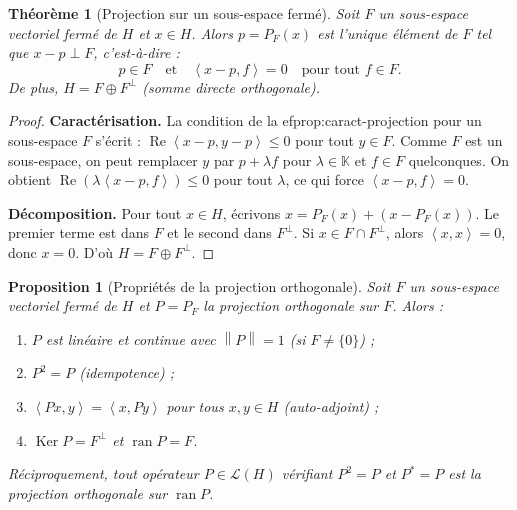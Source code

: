 \documentclass[a4paper,12pt]{book}
\DeclareMathOperator{\Ker}{Ker}
\DeclareMathOperator{\ran}{ran}
\newcommand{\K}{\mathbb{K}}
\newcommand{\norm}[1]{\left\| #1 \right\|}
\newcommand{\inner}[2]{\left\langle #1, #2 \right\rangle}
\theoremstyle{definition}
\theoremstyle{plain}
\newtheorem{theoreme}[definition]{Théorème}
\newtheorem{proposition}[definition]{Proposition}
\theoremstyle{remark}
\begin{document}
\begin{theoreme}[Projection sur un sous-espace fermé]\label{thm:proj-sous-espace}
Soit $F$ un sous-espace vectoriel fermé de $H$ et $x \in H$. Alors $p = P_F(x)$ est l'unique élément de $F$ tel que $x - p \perp F$, c'est-à-dire :
\[
    p \in F \quad \text{et} \quad \inner{x - p}{f} = 0 \quad \text{pour tout } f \in F.
\]
De plus, $H = F \oplus F^\perp$ (somme directe orthogonale).
\end{theoreme}

\begin{proof}
\textbf{Caractérisation.} La condition de la 
ef{prop:caract-projection} pour un sous-espace $F$ s'écrit : $\operatorname{Re}\inner{x-p}{y-p} \leq 0$ pour tout $y \in F$. Comme $F$ est un sous-espace, on peut remplacer $y$ par $p + \lambda f$ pour $\lambda \in \K$ et $f \in F$ quelconques. On obtient $\operatorname{Re}(\lambda\inner{x-p}{f}) \leq 0$ pour tout $\lambda$, ce qui force $\inner{x-p}{f} = 0$.

\textbf{Décomposition.} Pour tout $x \in H$, écrivons $x = P_F(x) + (x - P_F(x))$. Le premier terme est dans $F$ et le second dans $F^\perp$. Si $x \in F \cap F^\perp$, alors $\inner{x}{x} = 0$, donc $x = 0$. D'où $H = F \oplus F^\perp$.
\end{proof}

\begin{proposition}[Propriétés de la projection orthogonale]\label{prop:proj-orth-proprietes}
Soit $F$ un sous-espace vectoriel fermé de $H$ et $P = P_F$ la projection orthogonale sur $F$. Alors :
\begin{enumerate}[label=(\roman*)]
    \item $P$ est linéaire et continue avec $\norm{P} = 1$ (si $F \neq \{0\}$) ;
    \item $P^2 = P$ (idempotence) ;
    \item $\inner{Px}{y} = \inner{x}{Py}$ pour tous $x, y \in H$ (auto-adjoint) ;
    \item $\Ker P = F^\perp$ et $\ran P = F$.
\end{enumerate}
Réciproquement, tout opérateur $P \in \mathcal{L}(H)$ vérifiant $P^2 = P$ et $P^* = P$ est la projection orthogonale sur $\ran P$.
\end{proposition}
\end{document}
